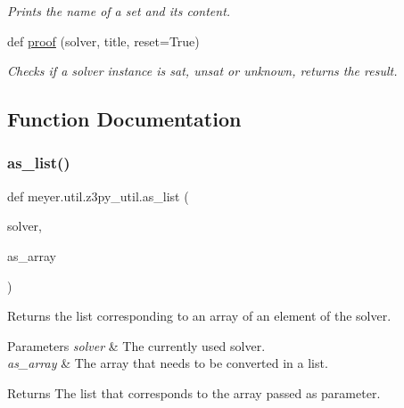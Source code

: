 \begin{DoxyCompactItemize}
\begin{DoxyCompactList}\small\item\em Prints the name of a set and its content. \end{DoxyCompactList}\item 
def \hyperlink{namespacemeyer_1_1util_1_1z3py__util_a6d3bdd5583300633c2b4562123a3e876}{proof} (solver, title, reset=True)
\begin{DoxyCompactList}\small\item\em Checks if a solver instance is sat, unsat or unknown, returns the result. \end{DoxyCompactList}\end{DoxyCompactItemize}


\subsection{Function Documentation}
\mbox{\label{namespacemeyer_1_1util_1_1z3py__util_a88b1476f6b8d614eb1907a94d711f40d}} 
\subsubsection{\texorpdfstring{as\+\_\+list()}{as\_list()}}
{\footnotesize\ttfamily def meyer.\+util.\+z3py\+\_\+util.\+as\+\_\+list (\begin{DoxyParamCaption}\item[{}]{solver,  }\item[{}]{as\+\_\+array }\end{DoxyParamCaption})}



Returns the list corresponding to an array of an element of the solver. 


\begin{DoxyParams}{Parameters}
{\em solver} & The currently used solver. \\
\hline
{\em as\+\_\+array} & The array that needs to be converted in a list. \\
\hline
\end{DoxyParams}
\begin{DoxyReturn}{Returns}
The list that corresponds to the array passed as parameter. 
\end{DoxyReturn}


